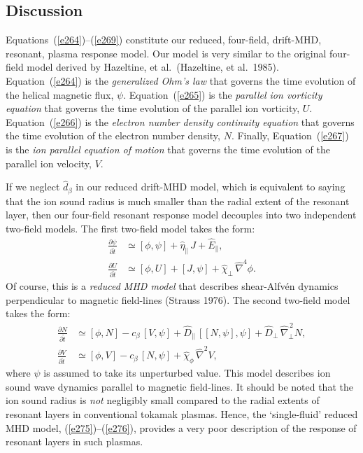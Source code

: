 \documentclass[notitlepage,12pt]{article}
\begin{document}
\subsection{Discussion}
Equations~(\ref{e264})--(\ref{e269}) constitute our reduced, four-field, drift-MHD, resonant, plasma response model. Our model is very similar
to the original four-field model derived by Hazeltine, et al.\ (Hazeltine, et al.\ 1985). Equation~(\ref{e264}) is the {\em generalized
Ohm's law}\/ that governs the time evolution of the helical magnetic flux, $\psi$. Equation~(\ref{e265}) is the {\em parallel
ion vorticity equation}\/ that governs the  time evolution of the parallel ion vorticity, $U$. 
Equation~(\ref{e266}) is the {\em electron number density continuity equation}\/ that 
governs the time evolution of the electron number density, $N$. Finally, Equation~(\ref{e267}) is the
{\em ion parallel equation of motion}\/ that governs the time evolution of the  parallel ion velocity, $V$. 

If we neglect $\hat{d}_\beta$ in our reduced drift-MHD model, which is equivalent to saying that the ion sound
radius is much smaller than the radial extent of the resonant layer, then our four-field resonant response model
decouples into two independent two-field models. The first two-field model takes the form:
\begin{align}\label{e275}
\frac{\partial\psi}{\partial\hat{t}}&\simeq [\phi,\psi]+\hat{\eta}_\parallel\,J + \hat{E}_\parallel,\\[0.5ex]
\frac{\partial U}{\partial \hat{t}}&\simeq [\phi,U]  + [J,\psi]+\hat{\chi}_\perp  \,\hat{\nabla}^4\phi.\label{e276}
\end{align}
Of course, this is a {\em reduced MHD model}\/ that describes shear-Alfv\'{e}n dynamics perpendicular to
magnetic field-lines (Strauss 1976). The second two-field model takes the form:
\begin{align}
\frac{\partial N}{\partial \hat{t}}&\simeq [\phi,N] -c_\beta\,[V,\psi] + \hat{D}_\parallel\,[[N,\psi],\psi]
+ \hat{D}_\perp\,\hat{\nabla}_\perp^{\,2}N,\\[0.5ex]
\frac{\partial V}{\partial\hat{t}}&\simeq [\phi,V] - c_\beta\,[N,\psi] + \hat{\chi}_\phi\,\hat{\nabla}^2 V,
\end{align}
where $\psi$ is assumed to take its unperturbed value. 
This model describes ion sound wave dynamics parallel to magnetic field-lines. It should be noted that the
ion sound radius is {\em not}\/ negligibly small compared to the radial extents of resonant layers in conventional 
tokamak plasmas. Hence, the `single-fluid' reduced MHD model, (\ref{e275})--(\ref{e276}), provides  a very poor description
of the response of  resonant layers in such plasmas. 
\end{document}

